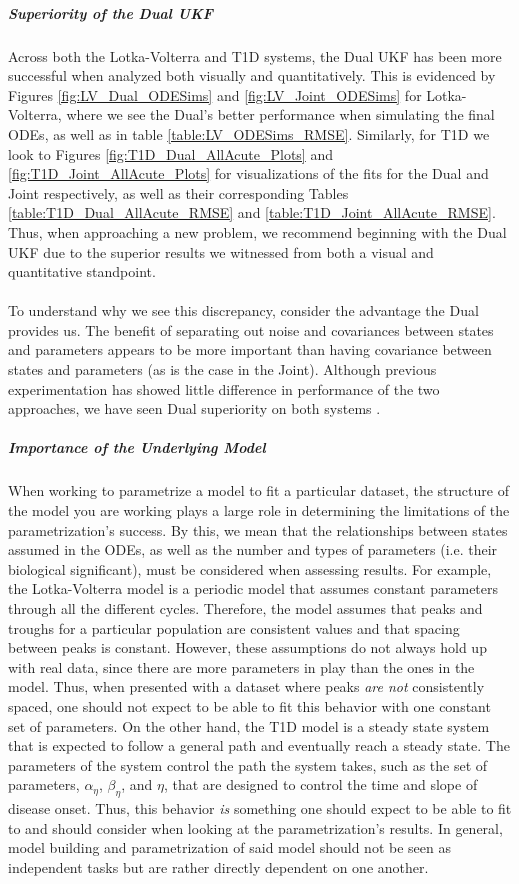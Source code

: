 \subparagraph{Superiority of the Dual UKF}
Across both the Lotka-Volterra and T1D systems, the Dual UKF has been more successful when analyzed both visually and quantitatively. This is evidenced by Figures \ref{fig:LV_Dual_ODESims} and \ref{fig:LV_Joint_ODESims} for Lotka-Volterra, where we see the Dual's better performance when simulating the final ODEs, as well as in table \ref{table:LV_ODESims_RMSE}. Similarly, for T1D we look to Figures \ref{fig:T1D_Dual_AllAcute_Plots} and \ref{fig:T1D_Joint_AllAcute_Plots} for visualizations of the fits for the Dual and Joint respectively, as well as their corresponding Tables \ref{table:T1D_Dual_AllAcute_RMSE} and \ref{table:T1D_Joint_AllAcute_RMSE}. Thus, when approaching a new problem, we recommend beginning with the Dual UKF due to the superior results we witnessed from both a visual and quantitative standpoint. \\
\\
To understand why we see this discrepancy, consider the advantage the Dual provides us. The benefit of separating out noise and covariances between states and parameters appears to be more important than having covariance between states and parameters (as is the case in the Joint). Although previous experimentation has showed little difference in performance of the two approaches, we have seen Dual superiority on both systems \cite{GoveHollingerDual}.

\subparagraph{Importance of the Underlying Model}
When working to parametrize a model to fit a particular dataset, the structure of the model you are working plays a large role in determining the limitations of the parametrization's success. By this, we mean that the relationships between states assumed in the ODEs, as well as the number and types of parameters (i.e. their biological significant), must be considered when assessing results. For example, the Lotka-Volterra model is a periodic model that assumes constant parameters through all the different cycles. Therefore, the model assumes that peaks and troughs for a particular population are consistent values and that spacing between peaks is constant. However, these assumptions do not always hold up with real data, since there are more parameters in play than the ones in the model. Thus, when presented with a dataset where peaks \emph{are not} consistently spaced, one should not expect to be able to fit this behavior with one constant set of parameters. On the other hand, the T1D model is a steady state system that is expected to follow a general path and eventually reach a steady state. The parameters of the system control the path the system takes, such as the set of parameters, $\alpha_\eta$, $\beta_\eta$, and $\eta$, that are designed to control the time and slope of disease onset. Thus, this behavior \emph{is} something one should expect to be able to fit to and should consider when looking at the parametrization's results. In general, model building and parametrization of said model should not be seen as independent tasks but are rather directly dependent on one another.

